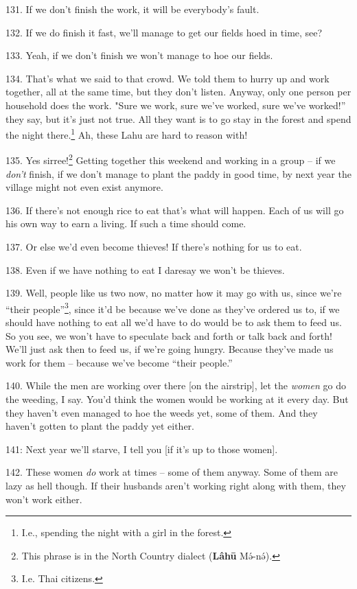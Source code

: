 131. If we don't finish the work, it will be everybody's fault.

132. If we do finish it fast, we'll manage to get our fields hoed in time, see?

133. Yeah, if we don't finish we won't manage to hoe our fields.

134. That's what we said to that crowd. We told them to hurry up and work together,
all at the same time, but they don't listen. Anyway, only one person per household
does the work. "Sure we work, sure we've worked, sure we've worked!''
they say, but it's just not true. All they want is to go stay in the forest and
spend the night there.\footnote{I.e., spending the night with a girl in the forest.} Ah, these Lahu are hard to reason with!

135. Yes sirree!\footnote{This phrase is in the North Country dialect (\textbf{Lâhū} Mə́-nə́).} Getting together this weekend and working in a group -- if
we\textit{ don't} finish, if we don't manage to plant the paddy in good time, by
next year the village might not even exist anymore.

136. If there's not enough rice to eat that's what will happen. Each of us will
go his own way to earn a living. If such a time should come.

137. Or else we'd even become thieves! If there's nothing for us to eat.

138. Even if we have nothing to eat I daresay we won't be thieves.

139. Well, people like us two now, no matter how it may go with us, since we're
``their people''\footnote{I.e. Thai citizens.}, since it'd be because we've done as they've ordered us to,
if we should have nothing to eat all we'd have to do would be to ask them to feed
us. So you see, we won't have to speculate back and forth or talk back and forth!
We'll just ask then to feed us, if we're going hungry. Because they've made us
work for them -- because we've become ``their people.''

140. While the men are working over there [on the airstrip], let the \textit{women
}go do the weeding, I say. You'd think the women would be working at it every day.
But they haven't even managed to hoe the weeds yet, some of them. And they haven't
gotten to plant the paddy yet either.

 141: Next year we'll starve, I tell you [if it's up
to those women].


142. These women \textit{do} work at times -- some of them anyway. Some of them
are lazy as hell though. If their husbands aren't working right along with them,
they won't work either.

